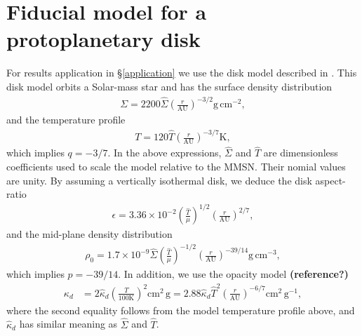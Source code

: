 \section{Fiducial model for a protoplanetary disk}\label{mmsn}
For results application in \S\ref{application} we use the disk model
described in \cite{chiang10}. This disk model orbits a Solar-mass star and 
has the surface density distribution
\begin{align}\label{mmsn_sigma}
  \Sigma = 2200
  \hat{\Sigma}\left(\frac{r}{\mathrm{AU}}\right)^{-3/2}\mathrm{g}\,\mathrm{cm}^{-2},  
\end{align}
and the temperature profile
\begin{align}\label{mmsn_temp}
  T = 120\hat{T}\left(\frac{r}{\mathrm{AU}}\right)^{-3/7} \mathrm{K},
\end{align}
which implies $q=-3/7$. In the above expressions, $\hat{\Sigma}$ and
$\hat{T}$ are dimensionless coefficients used to scale the model
relative to the MMSN. Their nomial values are unity. By assuming a
vertically isothermal disk, we deduce the disk aspect-ratio 
\begin{align}\label{mmsn_epsilon}
  \epsilon =
  3.36\times10^{-2}\left(\frac{\hat{T}}{\mu}\right)^{1/2}\left(\frac{r}{\mathrm{AU}}\right)^{2/7}, 
\end{align}
and the mid-plane density distribution 
\begin{align}
\rho_0 = 1.7\times10^{-9}
  \hat{\Sigma}\left(\frac{\hat{T}}{\mu}\right)^{-1/2}\left(\frac{r}{\mathrm{AU}}\right)^{-39/14}\mathrm{g}\,\mathrm{cm}^{-3},
\end{align}
which implies $p=-39/14$. 
In addition, we
use the opacity model {\bf(reference?)}
 \begin{align}
   \kappa_d &= 2 \hat{\kappa}_d \left(\frac{T}{100\mathrm{K}}\right)^2
   \mathrm{cm}^2\,\mathrm{g}
    =
   2.88\hat{\kappa}_d\hat{T}^2\left(\frac{r}{\mathrm{AU}}\right)^{-6/7}\mathrm{cm}^2\,\mathrm{g}^{-1},   
 \end{align}
where the second equality follows from the model temperature profile
above, and $\hat{\kappa}_d$ has similar meaning as $\hat{\Sigma}$ and
$\hat{T}$. 
